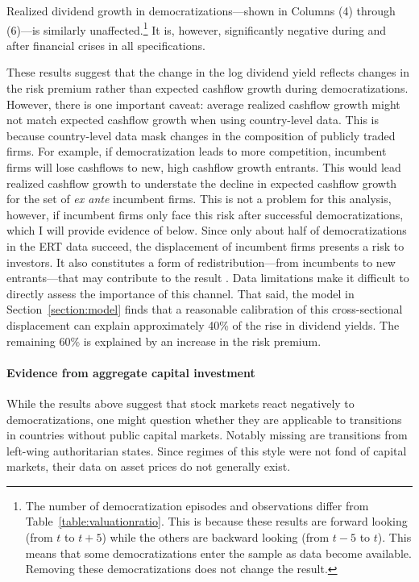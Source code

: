 \documentclass[12pt]{article}
\numberwithin{equation}{section}
\begin{document}
Realized dividend growth in democratizations---shown in Columns (4) through (6)---is similarly unaffected.\footnote{The number of democratization episodes and observations differ from Table~\ref{table:valuationratio}. This is because these results are forward looking (from  $t$ to $t+5$) while the others are backward looking (from  $t-5$ to $t$). This means that some democratizations enter the sample as data become available. Removing these democratizations does not change the result.} It is, however, significantly negative during and after financial crises in all specifications.

\label{par:expected_cashflows_growth}
These results suggest that the change in the log dividend yield reflects changes in the risk premium rather than expected cashflow growth during democratizations. However, there is one important caveat: average realized cashflow growth might not match expected cashflow growth when using country-level data. This is because country-level data mask changes in the composition of publicly traded firms. For example, if democratization leads to more competition, incumbent firms will lose cashflows to new, high cashflow growth entrants. This would lead realized cashflow growth to understate the decline in expected cashflow growth for the set of \textit{ex ante} incumbent firms. This is not a problem for this analysis, however, if incumbent firms only face this risk after successful democratizations, which I will provide evidence of below. Since only about half of democratizations in the ERT data succeed, the displacement of incumbent firms presents a risk to investors. It also constitutes a form of redistribution---from incumbents to new entrants---that may contribute to the result \citep*{Fisman2001,Garleanu2012}. Data limitations make it difficult to directly assess the importance of this channel. That said, the model in Section~\ref{section:model} finds that a reasonable calibration of this cross-sectional displacement can explain approximately 40\% of the rise in dividend yields. The remaining 60\% is explained by an increase in the risk premium.

\paragraph{Evidence from aggregate capital investment}\label{par:agg_invest_beg}
While the results above suggest that stock markets react negatively to democratizations, one might question whether they are applicable to transitions in countries without public capital markets. Notably missing are transitions from left-wing authoritarian states. Since regimes of this style were not fond of capital markets, their data on asset prices do not generally exist.
\end{document}
